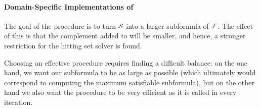 \paragraph{Domain-Specific Implementations of \grow} \label{para:domainspecificgrow}

The goal of the \grow procedure is to turn $\mathcal{S}$ into a larger subformula of $\mathcal{F} $. The effect of this is that the complement added to \setstohit will be smaller, and hence, a stronger restriction for the hitting set solver is found.  

Choosing an effective \grow procedure requires finding a difficult balance: on the one hand, we want our subformula to be as large as possible (which ultimately would correspond to computing the maximum satisfiable subformula), %
but on the other hand we also want the procedure to be very efficient as it is called in every iteration. 

